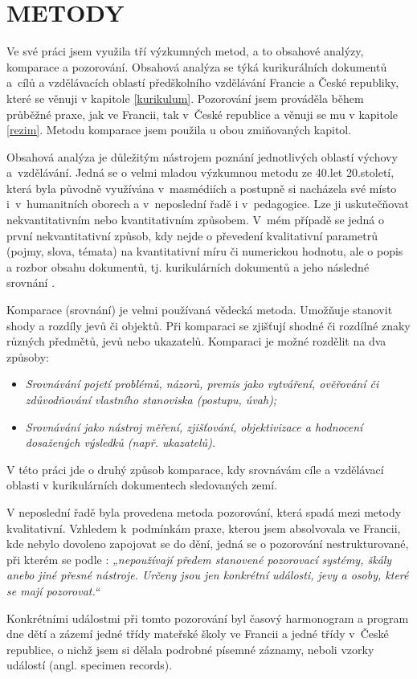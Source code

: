 
\chapter{METODY}

Ve své práci jsem využila tří výzkumných metod, a to obsahové analýzy, komparace a pozorování. Obsahová analýza se týká kurikurálních dokumentů a cílů a vzdělávacích oblastí předškolního vzdělávání Francie a České republiky, které se věnuji v kapitole \ref{kurikulum}. Pozorování jsem prováděla během průběžné praxe, jak ve Francii, tak v České republice a věnuji se mu v kapitole \ref{rezim}. Metodu komparace jsem použila u obou zmiňovaných kapitol. 

Obsahová analýza je důležitým nástrojem poznání jednotlivých oblastí výchovy a vzdělávání. Jedná se o velmi mladou výzkumnou metodu ze 40.let 20.století, která byla původně využívána v masmédiích a postupně si nacházela své místo i v humanitních oborech a v neposlední řadě i v pedagogice. Lze ji uskutečňovat nekvantitativním nebo kvantitativním způsobem. V mém případě se jedná o první nekvantitativní způsob, kdy nejde o převedení kvalitativní parametrů (pojmy, slova, témata) na kvantitativní míru či numerickou hodnotu, ale o popis a rozbor obsahu dokumentů, tj. kurikulárních dokumentů a jeho následné srovnání \citep{Gavora08}.

Komparace (srovnání) je velmi používaná vědecká metoda. Umožňuje stanovit shody a rozdíly jevů či objektů. Při komparaci se zjišťují shodné či rozdílné znaky různých předmětů, jevů nebo ukazatelů. 
Komparaci je možné rozdělit na dva způsoby:
\begin{itemize}
\item []\textit{Srovnávání pojetí problémů, názorů, premis jako vytváření, ověřování či zdůvodňování vlastního stanoviska (postupu, úvah);}
\item []\textit{Srovnávání jako nástroj měření, zjišťování, objektivizace a hodnocení dosažených výsledků (např. ukazatelů).} \citep[s.~19]{Siroky}
\end{itemize}
V této práci jde o druhý způsob komparace, kdy srovnávám cíle a vzdělávací oblasti v kurikulárních dokumentech sledovaných zemí.  

V neposlední řadě byla provedena metoda pozorování, která spadá mezi metody kvalitativní. Vzhledem k podmínkám praxe, kterou jsem absolvovala ve Francii, kde nebylo dovoleno zapojovat se do dění, jedná se o pozorování nestrukturované, při kterém se podle \citet[s.~17]{Gavora96}: \textit{„nepoužívají předem stanovené pozorovací systémy, škály anebo jiné přesné nástroje. Určeny jsou jen konkrétní události, jevy a osoby, které se mají pozorovat.“} 

Konkrétními událostmi při tomto pozorování byl časový harmonogram a program dne dětí a zázemí jedné třídy mateřské školy ve Francii a jedné třídy v České republice, o nichž jsem si dělala podrobné písemné záznamy, neboli vzorky událostí (angl. specimen records). 
